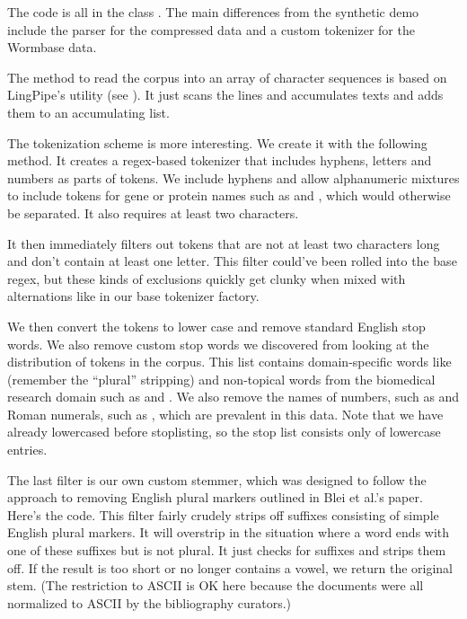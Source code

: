 The code is all in the class .  The main differences
from the synthetic demo include the parser for the compressed data and
a custom tokenizer for the Wormbase data.  

The method to read the corpus into an array of character sequences is
based on LingPipe's  utility (see
).  It just scans the lines and
accumulates texts and adds them to an accumulating list.

The tokenization scheme is more interesting.  We create it with
the following method.
%
%
It creates a regex-based tokenizer that includes hyphens, letters and
numbers as parts of tokens.  We include hyphens and allow alphanumeric
mixtures to include tokens for gene or protein names such as
 and , which would otherwise be
separated.  It also requires at least two characters.

It then immediately filters out tokens that are not at least two
characters long and don't contain at least one letter.  This filter
could've been rolled into the base regex, but these kinds of
exclusions quickly get clunky when mixed with alternations like in
our base tokenizer factory.  

We then convert the tokens to lower case and remove standard English
stop words.  We also remove custom stop words we discovered from
looking at the distribution of tokens in the corpus.  This list
contains domain-specific words like  (remember
the ``plural'' stripping) and non-topical words from the biomedical
research domain such as  and
.  We also remove the names of numbers, such
as  and Roman numerals, such as ,
which are prevalent in this data.  Note that we have already lowercased
before stoplisting, so the stop list consists only of lowercase
entries.

The last filter is our own custom stemmer, which was designed to
follow the approach to removing English plural markers outlined in
Blei et al.'s paper.  Here's the code.
%
%
This filter fairly crudely strips off suffixes consisting of simple
English plural markers.  It will overstrip in the situation where a
word ends with one of these suffixes but is not plural.  It just
checks for suffixes and strips them off.  If the result is too short
or no longer contains a vowel, we return the original stem.  (The
restriction to ASCII is OK here because the documents were all
normalized to ASCII by the bibliography curators.)





